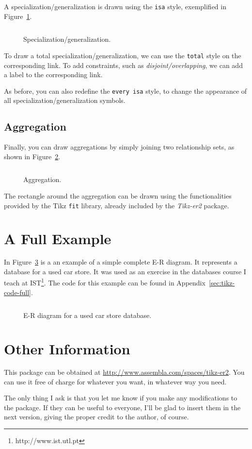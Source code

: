\documentclass[12pt]{article}
\newcommand{\demo}[1]{
  \bigskip
  \begin{minipage}{\linewidth}
      \begin{center}
          
      \end{center}
      \begin{center}
          \scriptsize
          \inputminted{latex}{snippets/#1.tex}
      \end{center}
  \end{minipage}
}
\begin{document}
A specialization/generalization is drawn using the \texttt{isa} style,
exemplified in Figure~\ref{fig:isa}.

\begin{figure}[htb!]
    \centering
    \demo{isa}
    \caption{Specialization/generalization.}
\label{fig:isa}
\end{figure}

To draw a total specialization/generalization, we can use the \texttt{total}
style on the corresponding link.  To add constraints, such as
\emph{disjoint/overlapping}, we can add a label to the corresponding link.

As before, you can also redefine the \texttt{every isa} style, to change the
appearance of all specialization/generalization symbols.

\subsection{Aggregation}
\label{sec:aggregation}

Finally, you can draw aggregations by simply joining two relationship sets, as
shown in Figure~\ref{fig:aggregation}.


\begin{figure}[htb!]
    \centering
    \demo{aggregation}
    \caption{Aggregation.}
    \label{fig:aggregation}
\end{figure}

The rectangle around the aggregation can be drawn using the functionalities
provided by the Tikz \texttt{fit} library, already included by the
\emph{Tikz-er2} package.

\section{A Full Example}
\label{sec:full-example}

In Figure~\ref{fig:cars} is a an example of a simple complete E-R diagram. It
represents a database for a used car store. It was used as an exercise in the
databases course I teach at IST\footnote{http://www.ist.utl.pt}. The code for
this example can be found in Appendix~\ref{sec:tikz-code-full}.

\begin{figure}[htb!]
    \demo{cars}
    \caption{E-R diagram for a used car store database.}
\label{fig:cars}
\end{figure}

\section{Other Information}
\label{sec:other-information}

This package can be obtained at
\url{http://www.assembla.com/spaces/tikz-er2}. You can use it
free of charge for whatever you want, in whatever way you need.

The only thing I ask is that you let me know if you make any modifications to
the package. If they can be useful to everyone, I'll be glad to insert them in
the next version, giving the proper credit to the author, of course.

\newpage

\appendix
\end{document}
